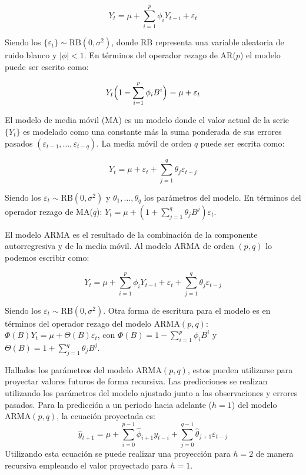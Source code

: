 \documentclass[
  12pt, a4paper, oneside]{article}
\begin{document}
\[Y_t = \mu + \sum_{i=1}^{p} \phi_i Y_{t-i} + \varepsilon_t\]

Siendo los \(\{\varepsilon_t\} \sim \text{RB}(0, \sigma^2)\), donde RB representa una variable aleatoria de ruido blanco y \(|\phi| < 1\). En términos del operador rezago de AR(\(p\)) el modelo puede ser escrito como:

\[Y_t \Bigl(1 - \sum_{i=1}^{p} \phi_i B^i \Bigr) = \mu + \varepsilon_t\]

El modelo de media móvil (MA) es un modelo donde el valor actual de la serie \(\{Y_t\}\) es modelado como una constante más la suma ponderada de sus errores pasados \((\varepsilon_{t-1}, \ldots, \varepsilon_{t-q})\). La media móvil de orden \(q\) puede ser escrita como:

\[Y_t = \mu + \varepsilon_t + \sum_{j=1}^{q} \theta_j \varepsilon_{t-j}\]

Siendo los \(\varepsilon_t \sim \text{RB}(0, \sigma^2)\) y \(\theta_1, \ldots, \theta_q\) los parámetros del modelo. En términos del operador rezago de MA(\(q\)): \(Y_t = \mu + (1 + \sum_{j=1}^{q} \theta_j B^j)\varepsilon_t\).

El modelo ARMA es el resultado de la combinación de la componente autorregresiva y de la media móvil. Al modelo ARMA de orden \((p, q)\) lo podemos escribir como:

\[Y_t = \mu + \sum_{i=1}^{p} \phi_i Y_{t-i} + \varepsilon_t + \sum_{j=1}^{q} \theta_j \varepsilon_{t-j}\]

Siendo los \(\varepsilon_t \sim \text{RB}(0, \sigma^2)\). Otra forma de escritura para el modelo es en términos del operador rezago del modelo ARMA\((p, q)\): \(\Phi(B)Y_t = \mu + \Theta(B)\varepsilon_t\), con \(\Phi(B) = 1 - \sum_{i=1}^{p} \phi_i B^i\) y \(\Theta(B) = 1 + \sum_{j=1}^{q} \theta_j B^j\).

Hallados los parámetros del modelo ARMA\((p, q)\), estos pueden utilizarse para proyectar valores futuros de forma recursiva. Las predicciones se realizan utilizando los parámetros del modelo ajustado junto a las observaciones y errores pasados. Para la predicción a un periodo hacia adelante (\(h=1\)) del modelo ARMA\((p, q)\), la ecuación proyectada es:
\begin{equation}
\hat{y}_{t+1} = \mu + \sum_{i=0}^{p-1} \hat{\phi}_{i+1} y_{t-i} + \sum_{j=0}^{q-1} \hat{\theta}_{j+1} \varepsilon_{t-j}
\end{equation}
Utilizando esta ecuación se puede realizar una proyección para \(h=2\) de manera recursiva empleando el valor proyectado para \(h=1\).
\end{document}
